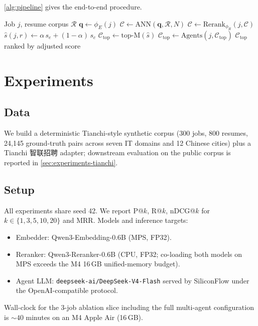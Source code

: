 \documentclass[11pt]{article}
\begin{document}
\cref{alg:pipeline} gives the end-to-end procedure.

\begin{algorithm}[t]
\small
\caption{End-to-end matching pipeline.}\label{alg:pipeline}
\begin{algorithmic}[1]
\Require Job $j$, resume corpus $\mathcal{R}$
\State $\mathbf{q} \gets \phi_E(j)$
\State $\mathcal{C} \gets \mathrm{ANN}(\mathbf{q}, \mathcal{R}, N)$ 
\State $\mathcal{C} \gets \mathrm{Rerank}_{\phi_R}(j, \mathcal{C})$
   \State $\hat{s}(j, r) \gets \alpha\,s_e + (1-\alpha)\,s_c$
\EndFor
\State $\mathcal{C}_\text{top} \gets \mathrm{top\text{-}M}(\hat{s})$
\State $\mathcal{C}_\text{top} \gets \mathrm{Agents}(j, \mathcal{C}_\text{top})$
\State \Return $\mathcal{C}_\text{top}$ ranked by adjusted score
\end{algorithmic}
\end{algorithm}

\section{Experiments}
\label{sec:experiments}

\subsection{Data}
We build a deterministic Tianchi-style synthetic corpus (300 jobs,
800 resumes, 24{,}145 ground-truth pairs across seven IT domains and
12 Chinese cities) plus a Tianchi 智联招聘 adapter; downstream
evaluation on the public corpus is reported in
\cref{sec:experiments-tianchi}.

\subsection{Setup}
All experiments share seed 42. We report
P@$k$, R@$k$, nDCG@$k$ for $k\in\{1,3,5,10,20\}$ and MRR. Models and
inference targets:
\begin{itemize}
\item Embedder: Qwen3-Embedding-0.6B (MPS, FP32).
\item Reranker: Qwen3-Reranker-0.6B (CPU, FP32; co-loading both
      models on MPS exceeds the M4 16\,GB unified-memory budget).
\item Agent LLM: \texttt{deepseek-ai/DeepSeek-V4-Flash} served by
      SiliconFlow under the OpenAI-compatible protocol.
\end{itemize}
Wall-clock for the 3-job ablation slice including the full multi-agent
configuration is ${\sim}40$ minutes on an M4 Apple Air (16\,GB).
\end{document}
